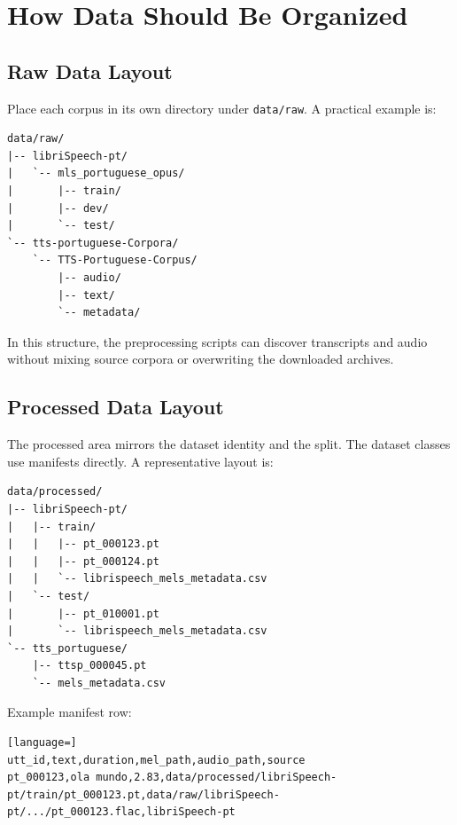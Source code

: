\documentclass[11pt]{article}
\newcommand{\pathtt}[1]{\texttt{#1}}
\begin{document}
\section{How Data Should Be Organized}

\subsection{Raw Data Layout}
Place each corpus in its own directory under \pathtt{data/raw}. A practical example is:

\begin{lstlisting}
data/raw/
|-- libriSpeech-pt/
|   `-- mls_portuguese_opus/
|       |-- train/
|       |-- dev/
|       `-- test/
`-- tts-portuguese-Corpora/
    `-- TTS-Portuguese-Corpus/
        |-- audio/
        |-- text/
        `-- metadata/
\end{lstlisting}

In this structure, the preprocessing scripts can discover transcripts and audio without mixing source corpora or overwriting the downloaded archives.

\subsection{Processed Data Layout}
The processed area mirrors the dataset identity and the split. The dataset classes use manifests directly. A representative layout is:

\begin{lstlisting}
data/processed/
|-- libriSpeech-pt/
|   |-- train/
|   |   |-- pt_000123.pt
|   |   |-- pt_000124.pt
|   |   `-- librispeech_mels_metadata.csv
|   `-- test/
|       |-- pt_010001.pt
|       `-- librispeech_mels_metadata.csv
`-- tts_portuguese/
    |-- ttsp_000045.pt
    `-- mels_metadata.csv
\end{lstlisting}

Example manifest row:

\begin{lstlisting}[language=]
utt_id,text,duration,mel_path,audio_path,source
pt_000123,ola mundo,2.83,data/processed/libriSpeech-pt/train/pt_000123.pt,data/raw/libriSpeech-pt/.../pt_000123.flac,libriSpeech-pt
\end{lstlisting}
\end{document}
